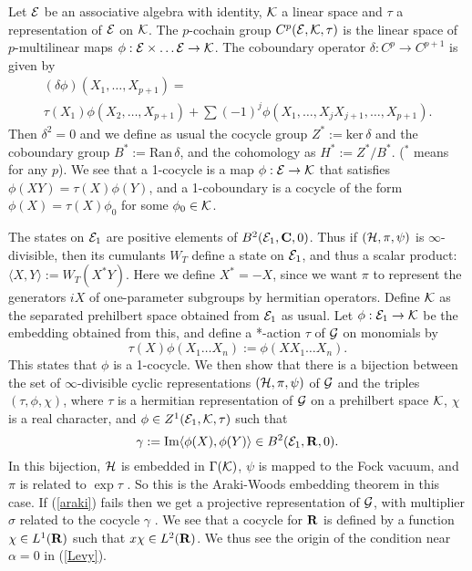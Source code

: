 Let ${\cal E}$ be an associative algebra with identity, ${\cal K}$ a linear
space and
$\tau$ a representation of ${\cal E}$ on ${\cal K}$. The $p$-cochain group
$C^p({\cal E},{\cal K},\tau)$ is the linear space of $p$-multilinear maps
$\phi:{\cal E}\times\ldots{\cal E}\rightarrow{\cal K}$. The coboundary
operator $\delta:C^p\rightarrow C^{p+1}$ is given by
\begin{multline}
(\delta\phi)(X_1,\ldots,X_{p+1})= \\
\tau(X_1)\phi(X_2,\ldots,X_{p+1})+
\sum(-1)^j\phi(X_1,\ldots,X_jX_{j+1},\ldots,X_{p+1}).
\end{multline}
Then $\delta^2=0$ and we define as usual the cocycle group $Z^*:=\mbox{ker}\,
\delta$ and the coboundary group $B^*:=\mbox{Ran}\,\delta$, and the
cohomology as $H^*:=Z^*/B^*$. ($^*$ means for any $p$). We see that
a 1-cocycle is a map $\phi:{\cal E}\rightarrow{\cal K}$ that satisfies
$\phi(XY)=\tau(X)\phi(Y)$, and a 1-coboundary 
is a cocycle of the form $\phi(X)=\tau(X)\phi_0$ for some $\phi_0\in
{\cal K}$.

The states on ${\cal E}_1$ are positive elements of $B^2
({\cal E}_1,{\bf C},0)$. Thus if $({\cal H},\pi,\psi)$ is
$\infty$-divisible, then its cumulants $W_T$ define a state on ${\cal E}_1$, and thus
a scalar product:
$\langle X,Y\rangle:=W_T(X^*Y)$. Here we define $X^*=-X$, since we want $\pi$
to represent the generators $iX$ of one-parameter subgroups by hermitian
operators. Define ${\cal K}$ as the separated prehilbert space obtained from
${\cal E}_1$ as usual. Let $\phi:{\cal E}_1\rightarrow{\cal K}$ be the
embedding obtained from this, and define a *-action $\tau$ of ${\cal G}$
on monomials by
\[\tau(X)\phi(X_1\ldots X_n):=\phi(XX_1\ldots X_n).\]
This states that $\phi$ is a 1-cocycle. We then show that there is a
bijection between the set of $\infty$-divisible cyclic representations
$({\cal H},\pi,\psi)$ of ${\cal G}$ and the triples $(\tau,\phi,\chi)$,
where $\tau$ is a hermitian representation of ${\cal G}$ on a prehilbert
space ${\cal K}$, $\chi$ is a real character, and
$\phi\in Z^1({\cal E}_1,{\cal K},\tau)$ such that
\begin{equation}
\gamma:=\mbox{Im}\langle\phi(X),\phi(Y)\rangle\in B^2({\cal E}_1,{\bf R},0).
\label{araki}
\end{equation}
In this bijection, ${\cal H}$ is embedded in $\Gamma({\cal K)}$, $\psi$ is
mapped to the Fock vacuum, and $\pi$ is related to $\exp\tau$ \cite{RFS4}.
So this is the Araki-Woods embedding theorem in this case.
If (\ref{araki}) fails then we get a projective representation of ${\cal G}$,
with multiplier $\sigma$ related to the cocycle $\gamma$
\cite{Mathon,Erven}. We see that a cocycle for ${\bf R}$ is defined by
a function $\chi\in L^1({\bf R})$ such that $x\chi\in L^2({\bf R})$.
We thus see the origin of the condition near $\alpha=0$ in (\ref{Levy}).



